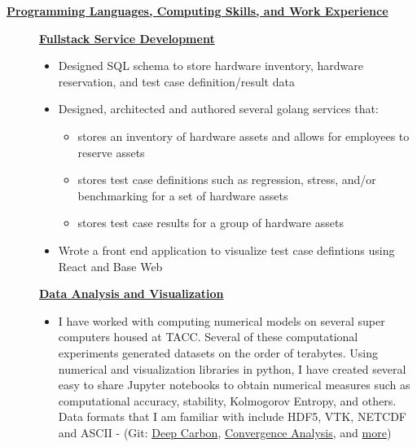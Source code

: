 \documentclass[11pt]{ltxdoc}
\begin{document}
\vskip 18pt

\begin{center}
	\textbf{\underline{Programming Languages, Computing Skills, and Work Experience}}
\end{center}


  \begin{description}
 	\item[] \textbf{\underline{Fullstack Service Development}}
 	\begin{itemize}
 	  \item Designed SQL schema to store hardware inventory, hardware reservation, and test case definition/result data
 	  \item Designed, architected and authored several golang services that:
 	    \begin{itemize}
 	      \item stores an inventory of hardware assets and allows for employees to reserve assets
          \item stores test case definitions such as regression, stress, and/or benchmarking for a set of hardware assets
          \item stores test case results for a group of hardware assets
 	    \end{itemize}
 	  \item Wrote a front end application to visualize test case defintions using React and Base Web
 	\end{itemize}
    \item[] \textbf{\underline{Data Analysis and Visualization}}
    
      \begin{itemize}
      	\item I have worked with computing numerical models on several super computers housed at TACC. Several of these computational experiments generated datasets on the order of terabytes. Using numerical and visualization libraries in python, I have created several easy to share Jupyter notebooks to obtain numerical measures such as computational accuracy, stability, Kolmogorov Entropy, and others. Data formats that I am familiar with include HDF5, VTK, NETCDF and ASCII - (Git: \href{https://github.com/hlokavarapu/Prospectus/blob/master/SlideDeck/MeetingPresentation.ipynb}{Deep Carbon}, \href{https://github.com/EGP-CIG-REU/SECOND_PARTICLE_PAPER/blob/master/00JUPYTER_NOTEBOOKS/egp_time_dependent_annulus_v-02/egp_time_dependent_annulus_v-02-Exact.ipynb}{Convergence Analysis}, and \href{https://github.com/hlokavarapu/Geology_Journal/tree/master/00JUPYTER}{more})
        

\end{itemize}
\end{description}
\end{document}
